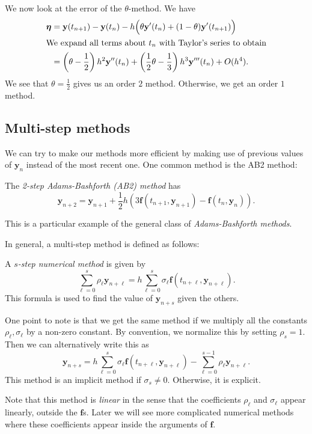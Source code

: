 \documentclass[a4paper]{article}
\begin{document}
We now look at the error of the $\theta$-method. We have
\begin{align*}
  \boldsymbol\eta &= \mathbf{y}(t_{n + 1}) - \mathbf{y}(t_n) - h \Big(\theta \mathbf{y}'(t_n) + (1 - \theta)\mathbf{y}'(t_{n + 1})\Big)\\
  \intertext{We expand all terms about $t_n$ with Taylor's series to obtain}
  &= \left(\theta - \frac{1}{2}\right) h^2 \mathbf{y}''(t_n) + \left(\frac{1}{2}\theta - \frac{1}{3}\right) h^3 \mathbf{y}'''(t_n) + O(h^4).
\end{align*}
We see that $\theta = \frac{1}{2}$ gives us an order $2$ method. Otherwise, we get an order $1$ method.

\subsection{Multi-step methods}
We can try to make our methods more efficient by making use of previous values of $\mathbf{y}_n$ instead of the most recent one. One common method is the AB2 method:
\begin{defi}
  The \emph{2-step Adams-Bashforth (AB2) method} has
  \[
    \mathbf{y}_{n + 2} = \mathbf{y}_{n + 1} + \frac{1}{2}h \left(3 \mathbf{f}(t_{n + 1}, \mathbf{y}_{n + 1}) - \mathbf{f}(t_n, \mathbf{y}_n)\right).
  \]
\end{defi}
This is a particular example of the general class of \emph{Adams-Bashforth methods}.

In general, a multi-step method is defined as follows:
\begin{defi}
  A \emph{$s$-step numerical method} is given by
  \[
    \sum_{\ell = 0}^s \rho_\ell \mathbf{y}_{n + \ell} = h \sum_{ \ell = 0}^s \sigma_\ell \mathbf{f}(t_{n + \ell}, \mathbf{y}_{n + \ell}).
  \]
  This formula is used to find the value of $\mathbf{y}_{n + s}$ given the others.
\end{defi}
One point to note is that we get the same method if we multiply all the constants $\rho_\ell, \sigma_\ell$ by a non-zero constant. By convention, we normalize this by setting $\rho_s = 1$. Then we can alternatively write this as
\[
  \mathbf{y}_{n + s} = h \sum_{\ell = 0}^s \sigma_\ell \mathbf{f}(t_{n + \ell}, \mathbf{y}_{n + \ell}) - \sum_{\ell = 0}^{s - 1} \rho_\ell \mathbf{y}_{n + \ell}.
\]
This method is an implicit method if $\sigma_s \not= 0$. Otherwise, it is explicit.

Note that this method is \emph{linear} in the sense that the coefficients $\rho_\ell$ and $\sigma_\ell$ appear linearly, outside the $\mathbf{f}$s. Later we will see more complicated numerical methods where these coefficients appear inside the arguments of $\mathbf{f}$.
\end{document}
